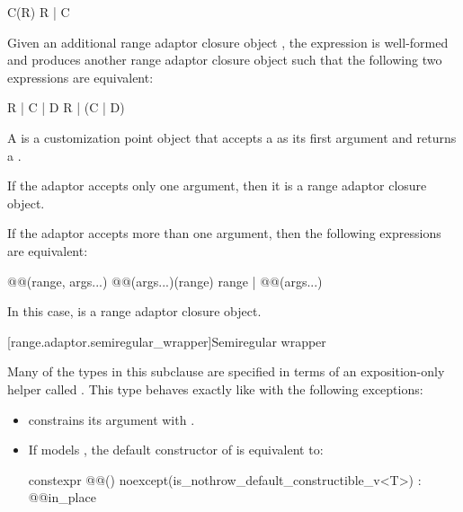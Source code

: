 \begin{addedblock}
\begin{codeblock}
C(R)
R | C
\end{codeblock}

Given an additional range adaptor closure object ,
the expression  is well-formed and produces another range adaptor
closure object such that the following two expressions are equivalent:

\begin{codeblock}
R | C | D
R | (C | D)
\end{codeblock}

\pnum
A  is a
customization point object
that accepts a  as its first argument and returns a
.

\pnum
If the adaptor accepts only one argument, then it is a range adaptor closure
object.

\pnum
If the adaptor accepts more than one argument, then the following expressions
are equivalent:

\begin{codeblock}
@@(range, args...)
@@(args...)(range)
range | @@(args...)
\end{codeblock}

In this case,  is a range adaptor
closure object.

[range.adaptor.semiregular_wrapper]{Semiregular wrapper}

\pnum
Many of the types in this subclause are specified in terms of an exposition-only
helper called . This type behaves exactly
like  with the following exceptions:

\begin{itemize}
\item {} constrains its argument
with .

\item If  models , the default
constructor of  is equivalent to:
\begin{codeblock}
constexpr @@()
  noexcept(is_nothrow_default_constructible_v<T>)
  : @@{in_place}
{ }
\end{codeblock}


\end{itemize}
\end{addedblock}
